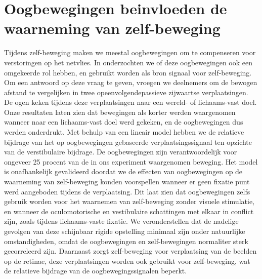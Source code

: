 \section{Oogbewegingen beinvloeden de waarneming van zelf-beweging}
Tijdens zelf-beweging maken we meestal oogbewegingen om te compenseren voor verstoringen op het netvlies. In  onderzochten we of deze oogbewegingen ook een omgekeerde rol hebben, en gebruikt worden als bron signaal voor zelf-beweging. Om een antwoord op deze vraag te geven, vroegen we deelnemers om de bewogen afstand te vergelijken in twee opeenvolgendepassieve zijwaartse verplaatsingen. De ogen keken tijdens deze verplaatsingen naar een wereld- of lichaams-vast doel. Onze resultaten laten zien dat bewegingen als korter werden waargenomen wanneer naar een lichaams-vast doel werd gekeken, en de oogbewegingen dus werden onderdrukt. Met behulp van een lineair model hebben we de relatieve bijdrage van het op oogbewegingen gebaseerde  verplaatsingssignaal ten opzichte van de verstibulaire bijdrage. De oogbewegingen zijn verantwoordelijk voor ongeveer 25 procent van de in ons experiment waargenomen beweging. Het model is onafhankelijk gevalideerd doordat we de effecten van oogbewegingen op de waarneming van zelf-beweging konden voorspellen wanneer er geen fixatie punt werd aangeboden tijdens de verplaatsing. Dit laat zien dat oogbewegingen zelfs gebruik worden voor het waarnemen van zelf-beweging zonder visuele stimulatie, en wanneer de oculomotorische en vestibulaire schattingen met elkaar in conflict zijn, zoals tijdens lichaams-vaste fixatie. We veronderstellen dat de nadelige gevolgen van deze schijnbaar rigide opstelling minimaal zijn onder natuurlijke omstandigheden, omdat de oogbewegingen en zelf-bewegingen normaliter sterk gecorreleerd zijn. Daarnaast zorgt zelf-beweging voor verplaatsing van de beelden op de retinae, deze verplaatsingen worden ook gebruikt voor zelf-beweging, wat de relatieve bijdrage van de oogbewegingssignalen beperkt. 

